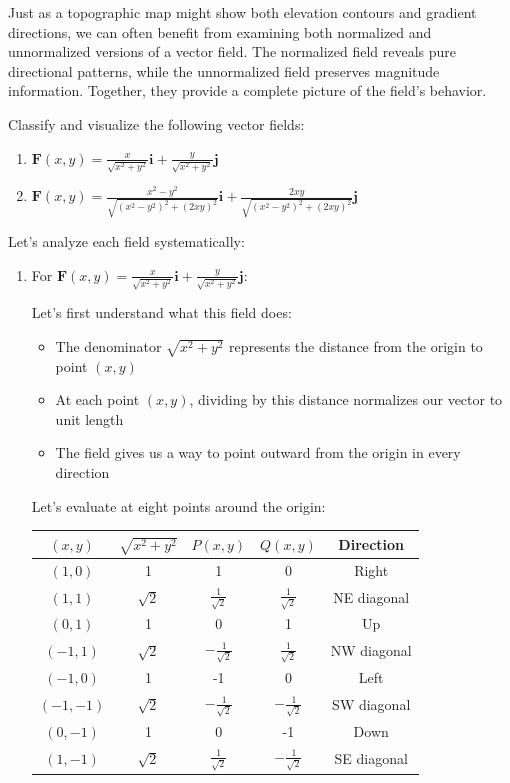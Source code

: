 \noindent Just as a topographic map might show both elevation contours and gradient directions, we can often benefit from examining both normalized and unnormalized versions of a vector field. The normalized field reveals pure directional patterns, while the unnormalized field preserves magnitude information. Together, they provide a complete picture of the field's behavior.

\exampleline
\begin{example}
Classify and visualize the following vector fields:
\begin{enumerate}
   \item $\mathbf{F}(x,y) = \frac{x}{\sqrt{x^2+y^2}}\mathbf{i} + \frac{y}{\sqrt{x^2+y^2}}\mathbf{j}$
   \item $\mathbf{F}(x,y) = \frac{x^2-y^2}{\sqrt{(x^2-y^2)^2 + (2xy)^2}}\mathbf{i} + \frac{2xy}{\sqrt{(x^2-y^2)^2 + (2xy)^2}}\mathbf{j}$
\end{enumerate}

\begin{solution}
Let's analyze each field systematically:

\begin{enumerate}
   \item For $\mathbf{F}(x,y) = \frac{x}{\sqrt{x^2+y^2}}\mathbf{i} + \frac{y}{\sqrt{x^2+y^2}}\mathbf{j}$:
   
   Let's first understand what this field does:
   \begin{itemize}
       \item The denominator $\sqrt{x^2+y^2}$ represents the distance from the origin to point $(x,y)$
       \item At each point $(x,y)$, dividing by this distance normalizes our vector to unit length
       \item The field gives us a way to point outward from the origin in every direction
   \end{itemize}
   
   Let's evaluate at eight points around the origin:
   \begin{center}
   \begin{tabular}{|c|c||c|c|c|}
   \hline
   $(x,y)$ & $\sqrt{x^2+y^2}$ & $P(x,y)$ & $Q(x,y)$ & Direction \\
   \hline
   $(1,0)$ & 1 & 1 & 0 & Right \\
   $(1,1)$ & $\sqrt{2}$ & $\frac{1}{\sqrt{2}}$ & $\frac{1}{\sqrt{2}}$ & NE diagonal \\
   $(0,1)$ & 1 & 0 & 1 & Up \\
   $(-1,1)$ & $\sqrt{2}$ & $-\frac{1}{\sqrt{2}}$ & $\frac{1}{\sqrt{2}}$ & NW diagonal \\
   $(-1,0)$ & 1 & -1 & 0 & Left \\
   $(-1,-1)$ & $\sqrt{2}$ & $-\frac{1}{\sqrt{2}}$ & $-\frac{1}{\sqrt{2}}$ & SW diagonal \\
   $(0,-1)$ & 1 & 0 & -1 & Down \\
   $(1,-1)$ & $\sqrt{2}$ & $\frac{1}{\sqrt{2}}$ & $-\frac{1}{\sqrt{2}}$ & SE diagonal \\
   \hline
   \end{tabular}
   \end{center}
   

\end{enumerate}
\end{solution}
\end{example}
